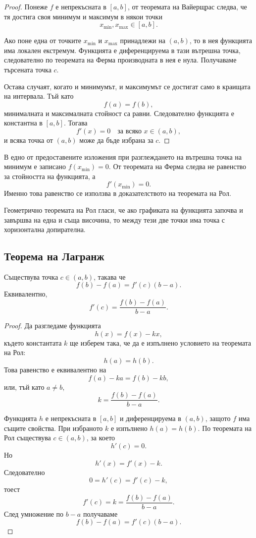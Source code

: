 \begin{proof}
Понеже $f$ е непрекъсната в $[a,b]$, от теоремата на Вайерщрас следва, че тя достига своя минимум и максимум в някои точки
\[
x_{\min},x_{\max}\in[a,b].
\]

Ако поне една от точките $x_{\min}$ и $x_{\max}$ принадлежи на $(a,b)$, то в нея функцията има локален екстремум. Функцията е диференцируема в тази вътрешна точка, следователно по теоремата на Ферма производната в нея е нула. Получаваме търсената точка $c$.

Остава случаят, когато и минимумът, и максимумът се достигат само в краищата на интервала. Тъй като
\[
f(a)=f(b),
\]
минималната и максималната стойност са равни. Следователно функцията е константна в $[a,b]$. Тогава
\[
f'(x)=0
\quad\text{за всяко }x\in(a,b),
\]
и всяка точка от $(a,b)$ може да бъде избрана за $c$.
\end{proof}

\begin{supp}[Бележка]
В едно от предоставените изложения при разглеждането на вътрешна точка на минимум е записано $f(x_{\min})=0$. От теоремата на Ферма следва не равенство за стойността на функцията, а
\[
f'(x_{\min})=0.
\]
Именно това равенство се използва в доказателството на теоремата на Рол.
\end{supp}

\begin{remark}
Геометрично теоремата на Рол гласи, че ако графиката на функцията започва и завършва на една и съща височина, то между тези две точки има точка с хоризонтална допирателна.
\end{remark}

\subsection{Теорема на Лагранж}\label{s:32.2.2}

\begin{keythm}
Съществува точка $c\in(a,b)$, такава че
\[
f(b)-f(a)=f'(c)(b-a).
\]
Еквивалентно,
\[
f'(c)=\frac{f(b)-f(a)}{b-a}.
\]
\end{keythm}

\begin{proof}
Да разгледаме функцията
\[
h(x)=f(x)-kx,
\]
където константата $k$ ще изберем така, че да е изпълнено условието на теоремата на Рол:
\[
h(a)=h(b).
\]
Това равенство е еквивалентно на
\[
f(a)-ka=f(b)-kb,
\]
или, тъй като $a\ne b$,
\[
k=\frac{f(b)-f(a)}{b-a}.
\]

Функцията $h$ е непрекъсната в $[a,b]$ и диференцируема в $(a,b)$, защото $f$ има същите свойства. При избраното $k$ е изпълнено $h(a)=h(b)$. По теоремата на Рол съществува $c\in(a,b)$, за което
\[
h'(c)=0.
\]
Но
\[
h'(x)=f'(x)-k.
\]
Следователно
\[
0=h'(c)=f'(c)-k,
\]
тоест
\[
f'(c)=k=\frac{f(b)-f(a)}{b-a}.
\]
След умножение по $b-a$ получаваме
\[
f(b)-f(a)=f'(c)(b-a).
\]
\end{proof}

